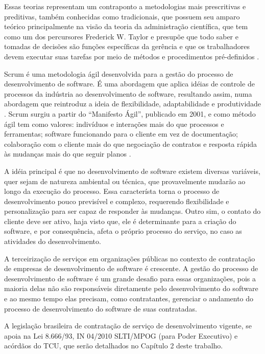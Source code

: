 Essas teorias representam um contraponto a metodologias mais prescritivas e preditivas, também conhecidas como tradicionais, que possuem seu amparo teórico principalmente na visão da teoria da administração científica, que tem como um dos percursores Frederick W. Taylor e presupõe que todo saber e tomadas de decisões são funções específicas da gerência e que os trabalhadores devem executar suas tarefas por meio de métodos e procedimentos pré-definidos \cite{administracao}.

Scrum é uma metodologia ágil desenvolvida para a gestão do processo de desenvolvimento de software. É uma abordagem que aplica idéias de controle de processos da indústria ao desenvolvimento de software, resultando assim, numa abordagem que reintroduz a ideia de flexibilidade, adaptabilidade e produtividade \cite{porto}. Scrum surgiu a partir do “Manifesto Ágil”, publicado em 2001, e como método ágil tem como valores: indivíduos e interações mais do que processos e ferramentas; software funcionando para o cliente em vez de documentação; colaboração com o cliente mais do que negociação de contratos e resposta rápida às mudanças mais do que seguir planos \cite{manifesto}. 

A idéia principal é que no desenvolvimento de software existem diversas variáveis, quer sejam de natureza ambiental ou técnica, que provavelmente mudarão ao longo da execução do processo. Essa característa torna o processo de desenvolvimento pouco previsível e complexo, requerendo flexibilidade e personalização para ser capaz de responder às mudanças. Outro sim, o contato do cliente deve ser ativo, haja visto que, ele é determinante para a criação do software, e por consequência, afeta o próprio processo do serviço, no caso as atividades do desenvolvimento.

A terceirização de serviços em organizações públicas no contexto de contratação de empresas de desenvolvimento de software é crescente. A gestão do processo de desenvolvimento de software é um grande desafio para essas organizações, pois a maioria delas não são responsáveis diretamente pelo desenvolvimento do software e ao mesmo tempo elas precisam, como contratantes, gerenciar o andamento do processo de desenvolvimento do software de suas contratadas. 

A legislação brasileira de contratação de serviço de desenvolvimento vigente, se apoia na Lei 8.666/93, IN 04/2010 SLTI/MPOG (para Poder Executivo) e acórdãos do TCU, que serão detalhados no Capítulo 2 deste trabalho. 



